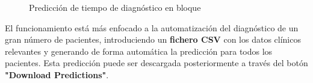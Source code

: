 \begin{figure}[h]
	\vspace{-5mm}
	\centering
	\captionsetup{belowskip=-25pt, justification=centering}
	\caption{Predicción de tiempo de diagnóstico en bloque}
	\label{fig:ch6batch}
\end{figure}

El funcionamiento está más enfocado a la automatización del diagnóstico de un gran número de pacientes, introduciendo un \textbf{fichero CSV} con los datos clínicos relevantes y generando de forma automática la predicción para todos los pacientes. Esta predicción puede ser descargada posteriormente a través del botón \textbf{"Download Predictions"}.
